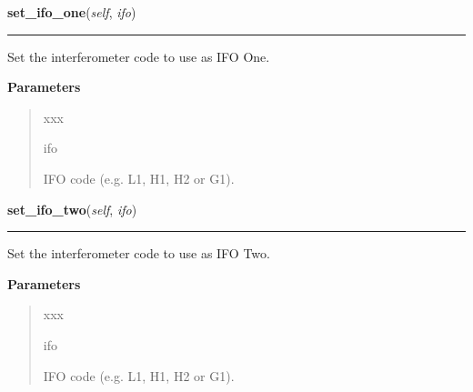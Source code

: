     \label{stochastic:StochasticNode:set_ifo_one}
    \vspace{0.5ex}

    \begin{boxedminipage}{\textwidth}

    \raggedright \textbf{set\_ifo\_one}(\textit{self}, \textit{ifo})

    \vspace{-1.5ex}

    \rule{\textwidth}{0.5\fboxrule}
    Set the interferometer code to use as IFO One.

    \vspace{1ex}

      \textbf{Parameters}
      \begin{quote}
        \begin{Ventry}{xxx}

          \item[ifo]

          IFO code (e.g. L1, H1, H2 or G1).

        \end{Ventry}

      \end{quote}

    \vspace{1ex}

    \end{boxedminipage}

    \label{stochastic:StochasticNode:set_ifo_two}
    \vspace{0.5ex}

    \begin{boxedminipage}{\textwidth}

    \raggedright \textbf{set\_ifo\_two}(\textit{self}, \textit{ifo})

    \vspace{-1.5ex}

    \rule{\textwidth}{0.5\fboxrule}
    Set the interferometer code to use as IFO Two.

    \vspace{1ex}

      \textbf{Parameters}
      \begin{quote}
        \begin{Ventry}{xxx}

          \item[ifo]

          IFO code (e.g. L1, H1, H2 or G1).

        \end{Ventry}

      \end{quote}

    \vspace{1ex}

    \end{boxedminipage}

